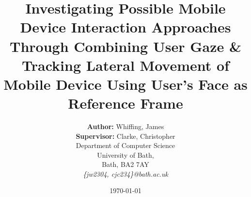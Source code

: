 
\thispagestyle{empty} %

\title{Investigating Possible Mobile Device Interaction Approaches Through Combining User Gaze \& Tracking Lateral Movement of Mobile Device Using User's Face as Reference Frame}

\renewcommand\maketitlehookb{\centering \Large CM50175 - Project Proposal}
\date{\today}
\author{
    \textbf{Author:} Whiffing, James\\
    \textbf{Supervisor:} Clarke, Christopher\\
    Department of Computer Science\\
    University of Bath,\\
    Bath, BA2 7AY \\
    \textit{\{jw2304, cjc234\}@bath.ac.uk}
}

\maketitle

\clearpage
\restoregeometry
\newpage

\setcounter{page}{0}
\pagestyle{fancy}


\tableofcontents
\clearpage
\newpage

\listoffigures
\clearpage
\newpage
{}
\listoftables
\clearpage
\newpage


\setcounter{page}{1}
